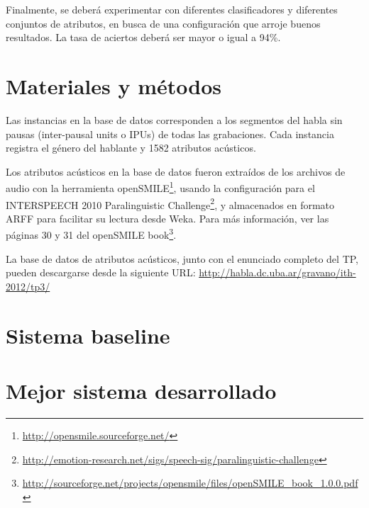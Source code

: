 \documentclass[10pt,a4paper]{article}
\begin{document}
Finalmente, se deberá experimentar con diferentes clasificadores y diferentes conjuntos de atributos, en busca de una configuración que arroje buenos resultados. La tasa de aciertos deberá ser mayor o igual a 94\%.

\section{Materiales y métodos}

Las instancias en la base de datos corresponden a los segmentos del habla sin pausas (inter-pausal units o IPUs) de todas las grabaciones. Cada instancia registra el género del hablante y 1582 atributos acústicos.

Los atributos acústicos en la base de datos fueron extraídos de los archivos de audio con la herramienta openSMILE\footnote{\url{http://opensmile.sourceforge.net/}}, usando la configuración para el INTERSPEECH 2010 Paralinguistic Challenge\footnote{\url{http://emotion-research.net/sigs/speech-sig/paralinguistic-challenge}}, y almacenados en formato ARFF para facilitar su lectura desde Weka. Para más información, ver las páginas 30 y 31 del openSMILE book\footnote{\url{http://sourceforge.net/projects/opensmile/files/openSMILE\_book\_1.0.0.pdf}}.

La base de datos de atributos acústicos, junto con el enunciado completo del TP, pueden descargarse desde la siguiente URL: \url{http://habla.dc.uba.ar/gravano/ith-2012/tp3/}

\section{Sistema baseline}

\lipsum[3]

\section{Mejor sistema desarrollado}

\lipsum[4]
\end{document}
